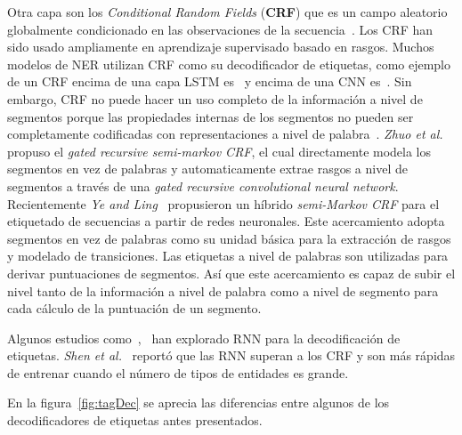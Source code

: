 Otra capa son los \emph{Conditional Random Fields} (\textbf{CRF}) que es un campo aleatorio globalmente condicionado en las observaciones de la secuencia~\cite{lafferty2001conditional}. Los CRF han sido usado ampliamente en aprendizaje supervisado basado en rasgos. Muchos modelos de NER utilizan CRF como su decodificador de etiquetas, como ejemplo de un CRF encima de una capa LSTM es~\cite{peters2018deep} y encima de una CNN es~\cite{collobert2011natural}. Sin embargo, CRF no puede hacer un uso completo de la informaci\'on a nivel de segmentos porque las propiedades internas de los segmentos no pueden ser completamente codificadas con representaciones a nivel de palabra~\cite{li2018survey}. \emph{Zhuo et al.}~\cite{zhuo2016segment} propuso el \emph{gated recursive semi-markov CRF}, el cual directamente modela los segmentos en vez de palabras y automaticamente extrae rasgos a nivel de segmentos a trav\'es de una \emph{gated recursive convolutional neural network}. Recientemente \emph{Ye and Ling}~\cite{ye2018hybrid} propusieron un h\'ibrido \emph{semi-Markov CRF} para el etiquetado de secuencias a partir de redes neuronales. Este acercamiento adopta segmentos en vez de palabras como su unidad b\'asica para la extracci\'on de rasgos y modelado de transiciones. Las etiquetas a nivel de palabras son utilizadas para derivar puntuaciones de segmentos. As\'i que este acercamiento es capaz de subir el nivel tanto de la informaci\'on a nivel de palabra como a nivel de segmento para cada c\'alculo de la puntuaci\'on de un segmento.

Algunos estudios como~\cite{zheng2017joint},~\cite{vaswani2016supertagging} han explorado RNN para la decodificaci\'on de etiquetas. \emph{Shen et al.}~\cite{shen2017deep} report\'o que las RNN superan a los CRF y son m\'as r\'apidas de entrenar cuando el n\'umero de tipos de entidades es grande.


En la figura~\ref{fig:tagDec} se aprecia las diferencias entre algunos de los decodificadores de etiquetas antes presentados.

